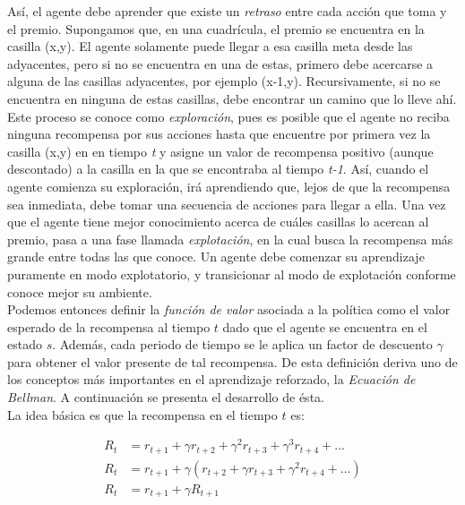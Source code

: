 As\'i, el agente debe aprender que existe un \textit{retraso} entre cada acci\'on que toma y el premio. Supongamos que, en una cuadr\'icula, el premio se encuentra en la casilla (x,y). El agente solamente puede llegar a esa casilla meta desde las adyacentes, pero si no se encuentra en una de estas, primero debe acercarse a alguna de las casillas adyacentes, por ejemplo (x-1,y). Recursivamente, si no se encuentra en ninguna de estas casillas, debe encontrar un camino que lo lleve ah\'i. Este proceso se conoce como \textit{exploraci\'on}, pues es posible que el agente no reciba ninguna recompensa por sus acciones hasta que encuentre por primera vez la casilla (x,y) en en tiempo \textit{t} y asigne un valor de recompensa positivo (aunque descontado) a la casilla en la que se encontraba al tiempo \textit{t-1}. As\'i, cuando el agente comienza su exploraci\'on, ir\'a aprendiendo que, lejos de que la recompensa sea inmediata, debe tomar una secuencia de acciones para llegar a ella. Una vez que el agente tiene mejor conocimiento acerca de cu\'ales casillas lo acercan al premio, pasa a una fase llamada \textit{explotaci\'on}, en la cual busca la recompensa m\'as grande entre todas las que conoce. Un agente debe comenzar su aprendizaje puramente en modo explotatorio, y transicionar al modo de explotaci\'on conforme conoce mejor su ambiente.\\

Podemos entonces definir la \textit{funci\'on de valor} asociada a la pol\'itica como el valor esperado de la recompensa al tiempo $t$ dado que el agente se encuentra en el estado $s$. Adem\'as, cada periodo de tiempo se le aplica un factor de descuento $\gamma$ para obtener el valor presente de tal recompensa. De esta definici\'on deriva uno de los conceptos m\'as importantes en el aprendizaje reforzado, la \textit{Ecuaci\'on de Bellman}. A continuaci\'on se presenta el desarrollo de \'esta. \\

La idea b\'asica es que la recompensa en el tiempo $t$ es:

\vspace{-30pt}
\begin{align*}
R_{t} &= r_{t+1} + \gamma r_{t+2} + \gamma^{2} r_{t+3} + \gamma^{3} r_{t+4} + ... \\
R_{t} &= r_{t+1} + \gamma \left( r_{t+2} + \gamma r_{t+3} + \gamma^{2}r_{t+4} + ...  \right)  \\
R_{t} &= r_{t+1} + \gamma R_{t+1}
\end{align*}

